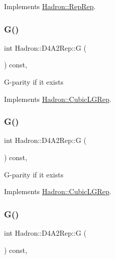 Implements \mbox{\hyperlink{structHadron_1_1RepRep_a92c8802e5ed7afd7da43ccfd5b7cd92b}{Hadron\+::\+Rep\+Rep}}.

\mbox{\label{structHadron_1_1D4A2Rep_aae5eadd2c620fdaa4919f64e4b8cec2d}} 
\subsubsection{\texorpdfstring{G()}{G()}\hspace{0.1cm}{\footnotesize\ttfamily [1/3]}}
{\footnotesize\ttfamily int Hadron\+::\+D4\+A2\+Rep\+::G (\begin{DoxyParamCaption}{ }\end{DoxyParamCaption}) const\hspace{0.3cm}{\ttfamily [inline]}, {\ttfamily [virtual]}}

G-\/parity if it exists 

Implements \mbox{\hyperlink{structHadron_1_1CubicLGRep_ace26f7b2d55e3a668a14cb9026da5231}{Hadron\+::\+Cubic\+L\+G\+Rep}}.

\mbox{\label{structHadron_1_1D4A2Rep_aae5eadd2c620fdaa4919f64e4b8cec2d}} 
\subsubsection{\texorpdfstring{G()}{G()}\hspace{0.1cm}{\footnotesize\ttfamily [2/3]}}
{\footnotesize\ttfamily int Hadron\+::\+D4\+A2\+Rep\+::G (\begin{DoxyParamCaption}{ }\end{DoxyParamCaption}) const\hspace{0.3cm}{\ttfamily [inline]}, {\ttfamily [virtual]}}

G-\/parity if it exists 

Implements \mbox{\hyperlink{structHadron_1_1CubicLGRep_ace26f7b2d55e3a668a14cb9026da5231}{Hadron\+::\+Cubic\+L\+G\+Rep}}.

\mbox{\label{structHadron_1_1D4A2Rep_aae5eadd2c620fdaa4919f64e4b8cec2d}} 
\subsubsection{\texorpdfstring{G()}{G()}\hspace{0.1cm}{\footnotesize\ttfamily [3/3]}}
{\footnotesize\ttfamily int Hadron\+::\+D4\+A2\+Rep\+::G (\begin{DoxyParamCaption}{ }\end{DoxyParamCaption}) const\hspace{0.3cm}{\ttfamily [inline]}, {\ttfamily [virtual]}}

